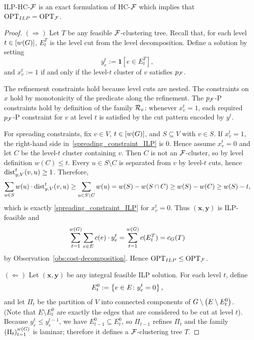     \begin{lemma}\label{lem:ilp-exact}
        \textsc{ILP-HC-$\mathcal{F}$} is an exact formulation of \textsc{HC-$\mathcal{F}$} which implies that $\text{OPT}_{ILP}=\text{OPT}_{\mathcal{F}}$.
    \end{lemma}
    \begin{proof}
        $(\Rightarrow)$ Let $T$ be any feasible $\mathcal{F}$-clustering tree.
        Recall that, for each level $t\in [w\mathopen{}\left( G \right)]$, $E_t^T$ is the level cut from the level decomposition. Define a solution by setting
        \[
            y_e^t:=\mathbf{1}[e\in E_t^T],
        \]
        and $x_v^t:=1$ if and only if the level-$t$ cluster of $v$ satisfies $p_{\mathcal{F}}$.

        The refinement constraints hold because level cuts are nested. The constraints on $x$ hold by monotonicity of the predicate along the refinement. The $p_{\mathcal{F}}$-P constraints hold by definition of the family $\mathcal{R}_v$: whenever $x_v^t=1$, each required $p_{\mathcal{F}}$-P constraint for $v$ at level $t$ is satisfied by the cut pattern encoded by $y^t$.

        For spreading constraints, fix $v\in V$, $t\in [w\mathopen{}\left( G \right)]$, and $S\subseteq V$ with $v\in S$. If $x_v^t=1$, the right-hand side in~\eqref{spreading_constraint_ILP} is $0$. Hence assume $x_v^t=0$ and let $C$ be the level-$t$ cluster containing $v$. Then $C$ is not an $\mathcal{F}$-cluster, so by level definition $w(C)\le t$. Every $u\in S\setminus C$ is separated from $v$ by level-$t$ cuts, hence $\text{dist}_{y, V}^{t}(v,u)\ge 1$. Therefore,
        \[
            \sum_{u\in S} w(u)\cdot \text{dist}_{y,V}^{t}(v,u)
            \ge \sum_{u\in S\setminus C} w(u)
            = w(S)-w(S\cap C)
            \ge w(S)-w(C)
            \ge w(S)-t,
        \]
        which is exactly \eqref{spreading_constraint_ILP} for $x_v^t=0$. Thus $(\mathbf{x},\mathbf{y})$ is ILP-feasible and
        \[
            \sum_{t=1}^{w\mathopen{}\left( G \right)}\sum_{e\in E} c(e)\cdot y_e^t
            = \sum_{t=1}^{w\mathopen{}\left( G \right)} c(E_t^T)
            = {c}_G(T)
        \]
        by Observation~\ref{obs:cost-decomposition}. Hence $\text{OPT}_{ILP}\le \text{OPT}_{\mathcal{F}}$.

        $(\Leftarrow)$ Let $(\mathbf{x},\mathbf{y})$ be any integral feasible ILP solution. For each level $t$, define
        \[
            E_t^0:=\mathopen{}\left\{ e\in E\colon y_e^t=0 \right\},
        \]
        and let $\Pi_t$ be the partition of $V$ into connected components of $G\setminus \mathopen{}\left( E\setminus E_t^0 \right)$. (Note that $E\setminus E_t^0$ are exactly the edges that are considered to be cut at level $t$). Because $y_e^t\le y_e^{t-1}$, we have $E_{t-1}^0\subseteq E_t^0$, so $\Pi_{t-1}$ refines $\Pi_t$ and the family $(\Pi_t)_{t=1}^{w\mathopen{}\left( G \right)}$ is laminar; therefore it defines a $\mathcal{F}$-clustering tree $T$.


\end{proof}
